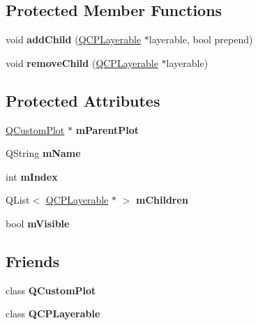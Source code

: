 \subsection*{Protected Member Functions}
\begin{DoxyCompactItemize}
\item 
\hypertarget{class_q_c_p_layer_a57ce5e49364aa9122276d5df3b4a0ddc}{}\label{class_q_c_p_layer_a57ce5e49364aa9122276d5df3b4a0ddc} 
void {\bfseries add\+Child} (\hyperlink{class_q_c_p_layerable}{Q\+C\+P\+Layerable} $\ast$layerable, bool prepend)
\item 
\hypertarget{class_q_c_p_layer_ac2f64ac7761650582d968d86670ef362}{}\label{class_q_c_p_layer_ac2f64ac7761650582d968d86670ef362} 
void {\bfseries remove\+Child} (\hyperlink{class_q_c_p_layerable}{Q\+C\+P\+Layerable} $\ast$layerable)
\end{DoxyCompactItemize}
\subsection*{Protected Attributes}
\begin{DoxyCompactItemize}
\item 
\hypertarget{class_q_c_p_layer_a2f3374a7884bf403720cd1cf6f7ad1bb}{}\label{class_q_c_p_layer_a2f3374a7884bf403720cd1cf6f7ad1bb} 
\hyperlink{class_q_custom_plot}{Q\+Custom\+Plot} $\ast$ {\bfseries m\+Parent\+Plot}
\item 
\hypertarget{class_q_c_p_layer_a91e6298183cb4b9dfd4efdfaf1ecc220}{}\label{class_q_c_p_layer_a91e6298183cb4b9dfd4efdfaf1ecc220} 
Q\+String {\bfseries m\+Name}
\item 
\hypertarget{class_q_c_p_layer_a122088bcab6cec76a52b75ce8606605b}{}\label{class_q_c_p_layer_a122088bcab6cec76a52b75ce8606605b} 
int {\bfseries m\+Index}
\item 
\hypertarget{class_q_c_p_layer_a704aa71bba469383c3a3c598c1ec0d28}{}\label{class_q_c_p_layer_a704aa71bba469383c3a3c598c1ec0d28} 
Q\+List$<$ \hyperlink{class_q_c_p_layerable}{Q\+C\+P\+Layerable} $\ast$ $>$ {\bfseries m\+Children}
\item 
\hypertarget{class_q_c_p_layer_a264950deb08e589460c126c895a1e2b5}{}\label{class_q_c_p_layer_a264950deb08e589460c126c895a1e2b5} 
bool {\bfseries m\+Visible}
\end{DoxyCompactItemize}
\subsection*{Friends}
\begin{DoxyCompactItemize}
\item 
\hypertarget{class_q_c_p_layer_a1cdf9df76adcfae45261690aa0ca2198}{}\label{class_q_c_p_layer_a1cdf9df76adcfae45261690aa0ca2198} 
class {\bfseries Q\+Custom\+Plot}
\item 
\hypertarget{class_q_c_p_layer_ad655f55cccf49ba14d5172ec517e07ae}{}\label{class_q_c_p_layer_ad655f55cccf49ba14d5172ec517e07ae} 
class {\bfseries Q\+C\+P\+Layerable}
\end{DoxyCompactItemize}


